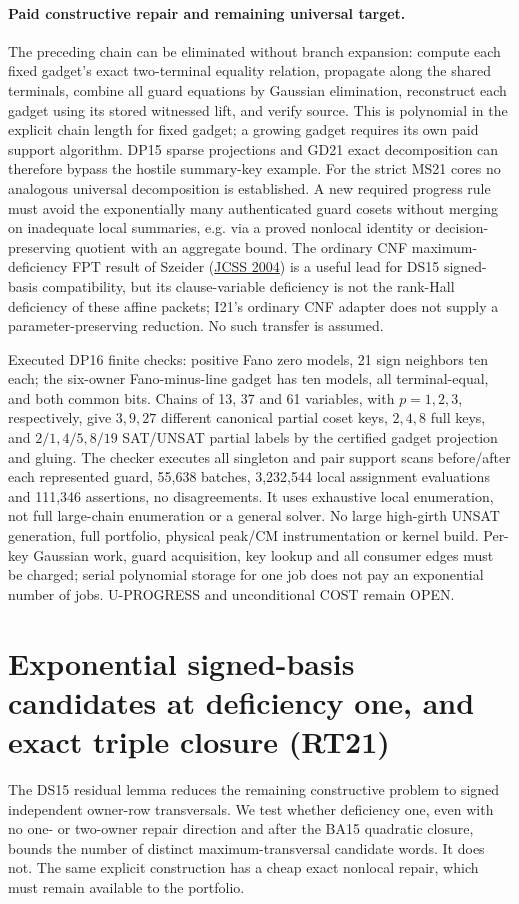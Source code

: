 \documentclass[11pt]{article}
\begin{document}
\paragraph{Paid constructive repair and remaining universal target.}
The preceding chain can be eliminated without branch expansion: compute each fixed gadget's exact two-terminal equality relation, propagate along the shared terminals, combine all guard equations by Gaussian elimination, reconstruct each gadget using its stored witnessed lift, and verify source. This is polynomial in the explicit chain length for fixed gadget; a growing gadget requires its own paid support algorithm. DP15 sparse projections and GD21 exact decomposition can therefore bypass the hostile summary-key example. For the strict MS21 cores no analogous universal decomposition is established. A new required progress rule must avoid the exponentially many authenticated guard cosets without merging on inadequate local summaries, e.g. via a proved nonlocal identity or decision-preserving quotient with an aggregate bound. The ordinary CNF maximum-deficiency FPT result of Szeider (\href{https://doi.org/10.1016/j.jcss.2004.04.009}{JCSS 2004}) is a useful lead for DS15 signed-basis compatibility, but its clause-variable deficiency is not the rank-Hall deficiency of these affine packets; I21's ordinary CNF adapter does not supply a parameter-preserving reduction. No such transfer is assumed.

Executed DP16 finite checks: positive Fano zero models, 21 sign neighbors ten each; the six-owner Fano-minus-line gadget has ten models, all terminal-equal, and both common bits. Chains of 13, 37 and 61 variables, with $p=1,2,3$, respectively, give $3,9,27$ different canonical partial coset keys, $2,4,8$ full keys, and $2/1,4/5,8/19$ SAT/UNSAT partial labels by the certified gadget projection and gluing. The checker executes all singleton and pair support scans before/after each represented guard, 55,638 batches, 3,232,544 local assignment evaluations and 111,346 assertions, no disagreements. It uses exhaustive local enumeration, not full large-chain enumeration or a general solver. No large high-girth UNSAT generation, full portfolio, physical peak/CM instrumentation or kernel build. Per-key Gaussian work, guard acquisition, key lookup and all consumer edges must be charged; serial polynomial storage for one job does not pay an exponential number of jobs. U-PROGRESS and unconditional COST remain OPEN.


\section{Exponential signed-basis candidates at deficiency one, and exact triple closure (RT21)}\label{sec:rt21}
The DS15 residual lemma reduces the remaining constructive problem to signed independent owner-row transversals. We test whether deficiency one, even with no one- or two-owner repair direction and after the BA15 quadratic closure, bounds the number of distinct maximum-transversal candidate words. It does not. The same explicit construction has a cheap exact nonlocal repair, which must remain available to the portfolio.
\end{document}
